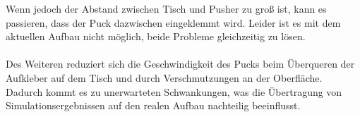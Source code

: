 Wenn jedoch der Abstand zwischen Tisch und Pusher zu groß ist, kann es passieren, dass der Puck dazwischen eingeklemmt wird. Leider ist es mit dem aktuellen Aufbau nicht möglich, beide Probleme gleichzeitig zu lösen.\\
\\Des Weiteren reduziert sich die Geschwindigkeit des Pucks beim Überqueren der Aufkleber auf dem Tisch und durch Verschmutzungen an der Oberfläche. Dadurch kommt es zu unerwarteten Schwankungen, was die Übertragung von Simulationsergebnissen auf den realen Aufbau nachteilig beeinflusst.\\





